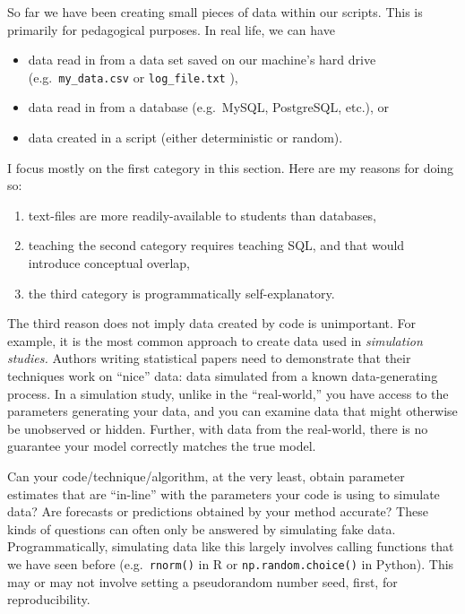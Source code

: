 \documentclass[
  12pt,
]{krantz}
\providecommand{\tightlist}{%
  \setlength{\itemsep}{0pt}\setlength{\parskip}{0pt}}
\begin{document}
So far we have been creating small pieces of data within our scripts. This is primarily for pedagogical purposes. In real life, we can have

\begin{itemize}
\tightlist
\item
  data read in from a data set saved on our machine's hard drive (e.g.~\texttt{my\_data.csv} or \texttt{log\_file.txt} ),
\item
  data read in from a database (e.g.~MySQL, PostgreSQL, etc.), or
\item
  data created in a script (either deterministic or random).
\end{itemize}

I focus mostly on the first category in this section. Here are my reasons for doing so:

\begin{enumerate}
\def\labelenumi{\arabic{enumi}.}
\tightlist
\item
  text-files are more readily-available to students than databases,
\item
  teaching the second category requires teaching SQL, and that would introduce conceptual overlap,
\item
  the third category is programmatically self-explanatory.
\end{enumerate}

The third reason does not imply data created by code is unimportant. For example, it is the most common approach to create data used in \emph{simulation studies.} Authors writing statistical papers need to demonstrate that their techniques work on ``nice'' data: data simulated from a known data-generating process. In a simulation study, unlike in the ``real-world,'' you have access to the parameters generating your data, and you can examine data that might otherwise be unobserved or hidden. Further, with data from the real-world, there is no guarantee your model correctly matches the true model.

Can your code/technique/algorithm, at the very least, obtain parameter estimates that are ``in-line'' with the parameters your code is using to simulate data? Are forecasts or predictions obtained by your method accurate? These kinds of questions can often only be answered by simulating fake data. Programmatically, simulating data like this largely involves calling functions that we have seen before (e.g.~\texttt{rnorm()} in R or \texttt{np.random.choice()} in Python). This may or may not involve setting a pseudorandom number seed, first, for reproducibility.
\end{document}
